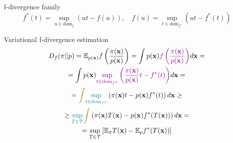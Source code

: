 \documentclass{beamer}
\begin{document}
\begin{frame}{f-divergence family}
	\vspace{-0.3cm}
	\[
		f^*(t) = \sup_{u \in \text{dom}_f} \left( ut - f(u) \right), \quad f(u) = \sup_{t \in \text{dom}_{f^*}} \left( ut - f^*(t) \right)
	\]
	\vspace{-0.5cm}
	\begin{block}{Variational f-divergence estimation}
		\vspace{-0.7cm}
		\begin{multline*}
			D_f(\pi || p) = \bbE_{p(\bx)}  f\left( \frac{\pi(\bx)}{p(\bx)} \right)  = \int p(\bx) {\color{violet}f\left( \frac{\pi(\bx)}{p(\bx)} \right) } d \bx = \\ = \int p(\bx) {\color{violet} \sup_{t \in \text{dom}_{f^*}} \left( \frac{\pi(\bx)}{p(\bx)} t - f^*(t) \right)} d \bx = \\ 
			= {\color{olive}\int} {\color{teal} \sup_{t \in \text{dom}_{f^*}}} \left( \pi(\bx)t - p(\bx) f^*(t) \right) d \bx \geq \\
		 \geq {\color{teal}\sup_{T \in \cT}} {\color{olive}\int} \left( \pi(\bx)T(\bx) - p(\bx) f^*(T(\bx)) \right) d \bx = \\
		 = \sup_{T \in \cT} \left[\bbE_{\pi}T(\bx) -  \bbE_p f^*(T(\bx)) \right]
		\end{multline*}
		\vspace{-0.6cm}
	\end{block}
\end{frame}
\end{document}
